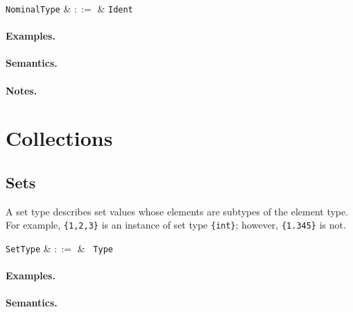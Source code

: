 \begin{syntax}
  \verb+NominalType+ & $::=$ & \verb+Ident+\\
\end{syntax}

\paragraph{Examples.}

\paragraph{Semantics.}

\paragraph{Notes.}


\section{Collections}


\subsection{Sets}

A set type describes set values whose elements are subtypes of the element type. For example, \lstinline|{1,2,3}| is an instance of set type \lstinline|{int}|; however, \lstinline|{1.345}| is not.

\begin{syntax}
  \verb+SetType+ & $::=$ & \token{\{} \ \verb+Type+ \ \token{\}} \\
\end{syntax}

\paragraph{Examples.}

\paragraph{Semantics.}

